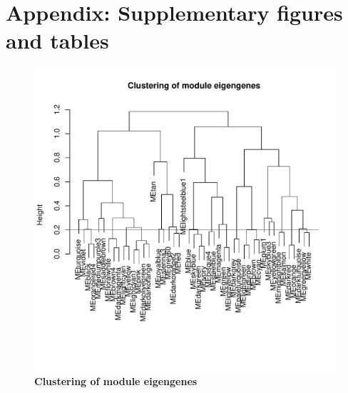 \section{Appendix: Supplementary figures and tables}

\begin{figure}[ht!]
      \centering
       \includegraphics[width=\linewidth]{CapMergeLine}
    \caption{\textbf{Clustering of module eigengenes}}
    \label{fig:fsCLust}
\end{figure}


